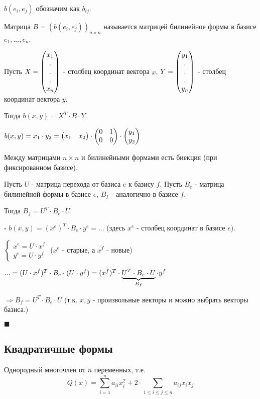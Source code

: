 \documentclass[../main.tex]{subfiles}
\begin{document}
$b(e_i,e_j)$ обозначим как $b_{ij}$.

\void{} Матрица $B = (b(e_i,e_j))_{n\times n}$ называется матрицей билинейное формы в базисе $e_1,...,e_n$.

\void{} Пусть $X = \begin{pmatrix} x_1\\.\\.\\.\\x_n\end{pmatrix}$ - столбец координат вектора $x$, $Y = \begin{pmatrix} y_1\\.\\.\\.\\y_n\end{pmatrix}$ -
столбец координат вектора $y$.

Тогда $b(x, y) = X^T\cdot B\cdot Y$.

\void{} $b(x, y) = x_1\cdot y_2 = \begin{pmatrix} x_1 & x_2\end{pmatrix}\cdot\begin{pmatrix} 0 & 1\\ 0 & 0\end{pmatrix}\cdot\begin{pmatrix} y_1\\y_2\end{pmatrix}$

\void{} Между матрицами $n\times n$ и билинейными формами есть биекция (при фиксированном базисе).

\void{} Пусть $U$ - матрица перехода от базиса $e$ к базису $f$. Пусть $B_e$ - матрица билинейной формы
в базисе $e$, $B_f$ - аналогично в базисе $f$.

Тогда $B_f = U^T\cdot B_e\cdot U$.

\void $\square$ $b(x,y) = (x^e)^T\cdot B_e\cdot y^e = ...$ (здесь $x^e$ - столбец координат в базисе $e$).

$\left\{ \begin{matrix} x^e = U\cdot x^f\\ y^e = U\cdot y^f \end{matrix} \right.$ ($x^e$ - старые, а $x^f$ - новые)

$... = (U\cdot x^f)^T\cdot B_e\cdot (U\cdot y^f) = (x^f)^T\cdot \underbrace{U^T\cdot B_e\cdot U}_{B_f}\cdot y^f$

$\Longrightarrow B_f = U^T\cdot B_e\cdot U$ (т.к. $x, y$ - произвольные векторы и можно выбрать векторы базиса.)

$\blacksquare$

\subsection{Квадратичные формы}

\void{} Однородный многочлен от $n$ переменных, т.е.
$$Q(x) = \sum_{i=1}^n a_{ii} x_i^2 + 2\cdot\sum_{1\leqslant i\leqslant j\leqslant n} a_{ij} x_i x_j$$
\end{document}
